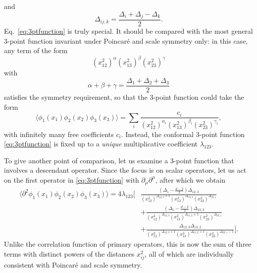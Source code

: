 \documentclass[a4paper,12pt]{article}
\numberwithin{equation}{section}
\begin{document}
and
\begin{equation}
	\Delta_{ij,k} = \frac{\Delta_i + \Delta_j - \Delta_k}{2}.
\end{equation}
Eq.~\eqref{eq:3ptfunction} is truly special. It should be compared with the most general 3-point function invariant under Poincaré and scale symmetry only: in this case, any term of the form
\begin{equation}
	(x_{12}^2)^\alpha
	(x_{13}^2)^\beta
	(x_{23}^2)^\gamma
\end{equation}
with
\begin{equation}
	\alpha + \beta + \gamma = \frac{\Delta_1 + \Delta_2 + \Delta_3}{2}
\end{equation}
satisfies the symmetry requirement, so that the 3-point function  could take the form
\begin{equation}
	\langle \phi_1(x_1) \phi_2(x_2) \phi_3(x_3) \rangle
	= \sum_i \frac{c_i}
	{(x_{12}^2)^{\alpha_i}
	(x_{13}^2)^{\beta_i}
	(x_{23}^2)^{\gamma_i}},
\end{equation}
with infinitely many free coefficients $c_i$. Instead, the conformal 3-point function \eqref{eq:3ptfunction} is fixed up to a \emph{unique} multiplicative coefficient $\lambda_{123}$.

To give another point of comparison, let us examine a 3-point function that involves a descendant operator. Since the focus is on scalar operators, let us act on the first operator in \eqref{eq:3ptfunction} with $\partial_\mu \partial^\mu$, after which we obtain
\begin{align}
	\langle \partial^2\phi_1(x_1) \phi_2(x_2) \phi_3(x_3) \rangle
	= 4 \lambda_{123} \bigg[ &
	\frac{\left( \Delta_1 - \frac{d-2}{2} \right) \Delta_{12,3}}
	{(x_{12}^2)^{\Delta_{12,3} + 1}
	(x_{13}^2)^{\Delta_{13,2}}
	(x_{23}^2)^{\Delta_{23,1}}}
	\nonumber \\
	& + \frac{\left( \Delta_1 - \frac{d-2}{2} \right) \Delta_{13,2}}
	{(x_{12}^2)^{\Delta_{12,3}}
	(x_{13}^2)^{\Delta_{13,2} + 1}
	(x_{23}^2)^{\Delta_{23,1}}}
	\nonumber \\
	& + \frac{\Delta_{12,3} \Delta_{13,2}}
	{(x_{12}^2)^{\Delta_{12,3} + 1}
	(x_{13}^2)^{\Delta_{13,2} + 1}
	(x_{23}^2)^{\Delta_{23,1} - 1}} \bigg].
	\label{eq:3pt:descendant}
\end{align}
Unlike the correlation function of primary operators, this is now the sum of three terms with distinct powers of the distances $x_{ij}^2$, all of which are individually consistent with Poincaré and scale symmetry.
\end{document}

